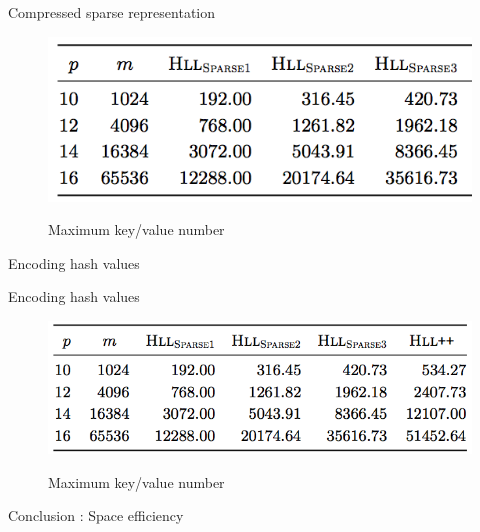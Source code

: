\documentclass{beamer}
\begin{document}
\begin{frame}{Compressed sparse representation}


\begin{figure}[c]
\includegraphics [scale=0.45]  {sparse123.png}

Maximum key/value number
\end{figure}

\end{frame}


\begin{frame}{Encoding hash values}
\end{frame}


\begin{frame}{Encoding hash values}


\begin{figure}[c]
\includegraphics [scale=0.45]  {sparse_all.png}

Maximum key/value number
\end{figure}

\end{frame}



\begin{frame}{Conclusion : Space efficiency}
\end{frame}
\end{document}
